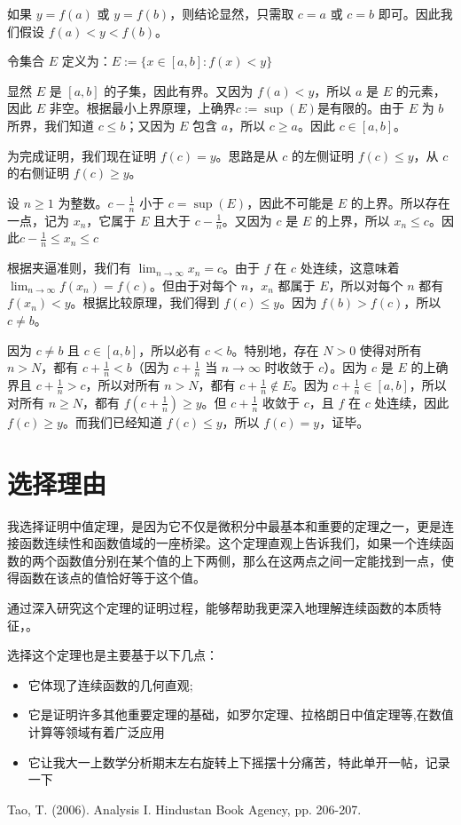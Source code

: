 \documentclass[a4paper]{article}
\begin{document}
如果 \(y = f(a)\) 或 \(y = f(b)\)，则结论显然，只需取 \(c = a\) 或 \(c = b\) 即可。因此我们假设 \(f(a) < y < f(b)\)。

令集合 \(E\) 定义为：\(E := \{x \in [a,b] : f(x) < y\}\)

显然 \(E\) 是 \([a,b]\) 的子集，因此有界。又因为 \(f(a) < y\)，所以 \(a\) 是 \(E\) 的元素，因此 \(E\) 非空。根据最小上界原理，上确界\(c := \sup(E)\)是有限的。由于 \(E\) 为 \(b\) 所界，我们知道 \(c \leq b\)；又因为 \(E\) 包含 \(a\)，所以 \(c \geq a\)。因此 \(c \in [a,b]\)。

为完成证明，我们现在证明 \(f(c) = y\)。思路是从 \(c\) 的左侧证明 \(f(c) \leq y\)，从 \(c\) 的右侧证明 \(f(c) \geq y\)。

设 \(n \geq 1\) 为整数。\(c - \frac{1}{n}\) 小于 \(c = \sup(E)\)，因此不可能是 \(E\) 的上界。所以存在一点，记为 \(x_n\)，它属于 \(E\) 且大于 \(c - \frac{1}{n}\)。又因为 \(c\) 是 \(E\) 的上界，所以 \(x_n \leq c\)。因此\(c - \frac{1}{n} \leq x_n \leq c\)

根据夹逼准则，我们有 \(\lim_{n \to \infty} x_n = c\)。由于 \(f\) 在 \(c\) 处连续，这意味着 \(\lim_{n \to \infty} f(x_n) = f(c)\)。但由于对每个 \(n\)，\(x_n\) 都属于 \(E\)，所以对每个 \(n\) 都有 \(f(x_n) < y\)。根据比较原理，我们得到 \(f(c) \leq y\)。因为 \(f(b) > f(c)\)，所以 \(c \neq b\)。

因为 \(c \neq b\) 且 \(c \in [a,b]\)，所以必有 \(c < b\)。特别地，存在 \(N > 0\) 使得对所有 \(n > N\)，都有 \(c + \frac{1}{n} < b\)（因为 \(c + \frac{1}{n}\) 当 \(n \to \infty\) 时收敛于 \(c\)）。因为 \(c\) 是 \(E\) 的上确界且 \(c + \frac{1}{n} > c\)，所以对所有 \(n > N\)，都有 \(c + \frac{1}{n} \notin E\)。因为 \(c + \frac{1}{n} \in [a,b]\)，所以对所有 \(n \geq N\)，都有 \(f(c + \frac{1}{n}) \geq y\)。但 \(c + \frac{1}{n}\) 收敛于 \(c\)，且 \(f\) 在 \(c\) 处连续，因此 \(f(c) \geq y\)。而我们已经知道 \(f(c) \leq y\)，所以 \(f(c) = y\)，证毕。

\section{选择理由}

我选择证明中值定理，是因为它不仅是微积分中最基本和重要的定理之一，更是连接函数连续性和函数值域的一座桥梁。这个定理直观上告诉我们，如果一个连续函数的两个函数值分别在某个值的上下两侧，那么在这两点之间一定能找到一点，使得函数在该点的值恰好等于这个值。


通过深入研究这个定理的证明过程，能够帮助我更深入地理解连续函数的本质特征，。

选择这个定理也是主要基于以下几点：
\begin{itemize}[label=\tiny{$\bullet$}, itemsep=0pt]
    \item 它体现了连续函数的几何直观;
    \item 它是证明许多其他重要定理的基础，如罗尔定理、拉格朗日中值定理等,在数值计算等领域有着广泛应用
    \item 它让我大一上数学分析期末左右旋转上下摇摆十分痛苦，特此单开一帖，记录一下
\end{itemize}

\begin{thebibliography}{99}
     Tao, T. (2006). Analysis I. Hindustan Book Agency, pp. 206-207.
\end{thebibliography}
\end{document}
